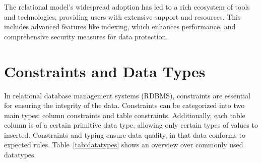 The relational model's widespread adoption has led to a rich ecosystem of tools and technologies, providing users with extensive support and resources. This includes advanced features like indexing, which enhances performance, and comprehensive security measures for data protection.

\section{Constraints and Data Types}

In relational database management systems (RDBMS), constraints are essential for ensuring the integrity of the data. Constraints can be categorized into two main types: column constraints and table constraints. Additionally, each table column is of a certain primitive data type, allowing only certain types of values to inserted. Constraints and typing ensure data quality, in that data conforms to expected rules. Table~\ref{tab:datatypes} shows an overview over commonly used datatypes. 

